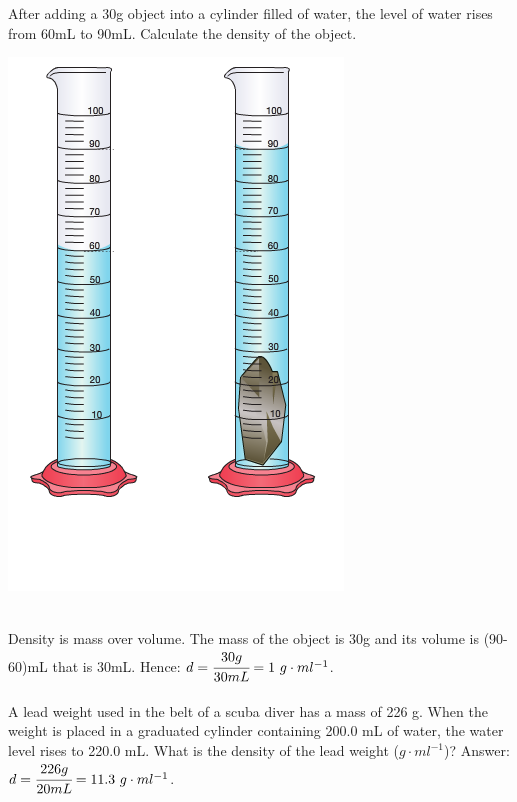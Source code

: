 \documentclass[main.tex]{subfiles}
\begin{document}
\begin{description}
\begin{example} %
After adding a 30g object into a cylinder filled of water, the level of water rises from 60mL to 90mL. Calculate the density of the object. 
\begin{center} \includegraphics[width=0.4\linewidth]{chapter1/figure1-10}   \end{center}
\\
Density is mass over volume. The mass of the object is 30g and its volume is (90-60)mL that is 30mL. Hence: $d=\cfrac{30g}{30mL}=1\text{ }g\cdot ml^{-1}$.
\\
\faDiamond\ \\
A lead weight used in the belt of a scuba diver has a mass of 226 g. When the weight is placed in a graduated cylinder containing 200.0 mL of water, the water level rises to 220.0 mL. What is the density of the lead weight ($g\cdot ml^{-1}$)?
\flushright Answer:$d=\cfrac{226g}{20mL}=11.3\text{ }g\cdot ml^{-1}$.
\end{example}%

\end{description}
\end{document}
